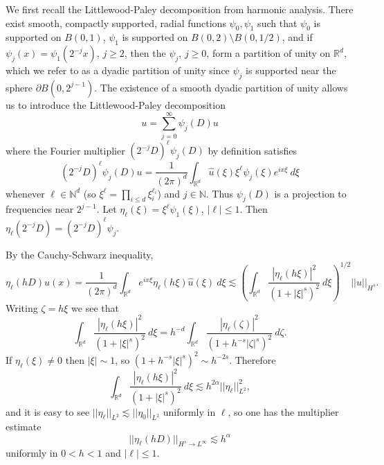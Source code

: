 \documentclass[10pt]{article}
\newcommand{\NN}{\mathbb{N}}
\newcommand{\RR}{\mathbb{R}}
\theoremstyle{definition}
\begin{document}
We first recall the Littlewood-Paley decomposition from harmonic analysis.
There exist smooth, compactly supported, radial functions $\psi_0,\psi_1$ such that $\psi_0$ is supported on $B(0, 1)$, $\psi_1$ is supported on $B(0, 2) \setminus B(0, 1/2)$, and if $\psi_j(x) = \psi_1(2^{-j}x)$, $j \geq 2$, then the $\psi_j$, $j \geq 0$, form a partition of unity on $\RR^d$,
which we refer to as a dyadic partition of unity since $\psi_j$ is supported near the sphere $\partial B(0, 2^{j-1})$.
The existence of a smooth dyadic partition of unity allows us to introduce the Littlewood-Paley decomposition
\begin{equation}
\label{LP decomp}
u = \sum_{j=0}^\infty \psi_j(D)u
\end{equation}
where the Fourier multiplier $(2^{-j}D)^\ell \psi_j(D)$ by definition satisfies
$$(2^{-j}D)^\ell \psi_j(D)u = \frac{1}{(2\pi)^d} \int_{\RR^d} \hat u(\xi) \xi^\ell \psi_j(\xi) e^{ix\xi} ~d\xi$$
whenever $\ell \in \NN^d$ (so $\xi^\ell = \prod_{i \leq d} \xi_i^{\ell_i}$) and $j \in \NN$.
Thus $\psi_j(D)$ is a projection to frequencies near $2^{j-1}$.
Let $\eta_\ell(\xi) = \xi^\ell \psi_1(\xi)$, $|\ell| \leq 1$. Then $\eta_\ell(2^{-j}D) = (2^{-j}D)^\ell \psi_j$.

By the Cauchy-Schwarz inequality,
$$\eta_\ell(hD)u(x) = \frac{1}{(2\pi)^d} \int_{\RR^d} e^{ix\xi} \eta_\ell(h\xi) \hat u(\xi) ~d\xi \lesssim \left(\int_{\RR^d} \frac{|\eta_\ell(h\xi)|^2}{(1 + |\xi|^s)^2} ~d\xi\right)^{1/2} ||u||_{H^s}.$$
Writing $\zeta = h\xi$ we see that
$$\int_{\RR^d} \frac{|\eta_\ell(h\xi)|^2}{(1 + |\xi|^s)^2} ~d\xi = h^{-d} \int_{\RR^d} \frac{|\eta_\ell(\zeta)|^2}{(1 + h^{-s}|\zeta|^s)^2} ~d\zeta.$$
If $\eta_\ell(\xi) \neq 0$ then $|\xi| \sim 1$, so $(1 + h^{-s}|\xi|^s)^2 \sim h^{-2s}$. Therefore
$$\int_{\RR^d} \frac{|\eta_\ell(h\xi)|^2}{(1 + |\xi|^s)^2} ~d\xi \lesssim h^{2\alpha} ||\eta_\ell||_{L^2}^2,$$
and it is easy to see $||\eta_\ell||_{L^2} \lesssim ||\eta_0||_{L^2}$ uniformly in $\ell$, so one has the multiplier estimate
\begin{equation}
\label{multiplier estimate}
||\eta_\ell(hD)||_{H^s \to L^\infty} \lesssim h^\alpha
\end{equation}
uniformly in $0 < h < 1$ and $|\ell| \leq 1$.
\end{document}
